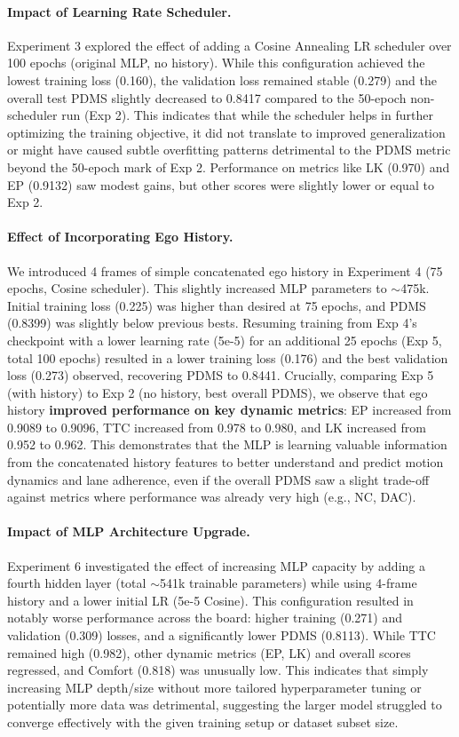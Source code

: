 \documentclass{article}
\begin{document}
\paragraph{Impact of Learning Rate Scheduler.}
Experiment 3 explored the effect of adding a Cosine Annealing LR scheduler over 100 epochs (original MLP, no history). While this configuration achieved the lowest training loss (0.160), the validation loss remained stable (0.279) and the overall test PDMS slightly decreased to 0.8417 compared to the 50-epoch non-scheduler run (Exp 2). This indicates that while the scheduler helps in further optimizing the training objective, it did not translate to improved generalization or might have caused subtle overfitting patterns detrimental to the PDMS metric beyond the 50-epoch mark of Exp 2. Performance on metrics like LK (0.970) and EP (0.9132) saw modest gains, but other scores were slightly lower or equal to Exp 2.

\paragraph{Effect of Incorporating Ego History.}
We introduced 4 frames of simple concatenated ego history in Experiment 4 (75 epochs, Cosine scheduler). This slightly increased MLP parameters to $\sim$475k. Initial training loss (0.225) was higher than desired at 75 epochs, and PDMS (0.8399) was slightly below previous bests. Resuming training from Exp 4's checkpoint with a lower learning rate (5e-5) for an additional 25 epochs (Exp 5, total 100 epochs) resulted in a lower training loss (0.176) and the best validation loss (0.273) observed, recovering PDMS to 0.8441. Crucially, comparing Exp 5 (with history) to Exp 2 (no history, best overall PDMS), we observe that ego history \textbf{improved performance on key dynamic metrics}: EP increased from 0.9089 to 0.9096, TTC increased from 0.978 to 0.980, and LK increased from 0.952 to 0.962. This demonstrates that the MLP is learning valuable information from the concatenated history features to better understand and predict motion dynamics and lane adherence, even if the overall PDMS saw a slight trade-off against metrics where performance was already very high (e.g., NC, DAC).

\paragraph{Impact of MLP Architecture Upgrade.}
Experiment 6 investigated the effect of increasing MLP capacity by adding a fourth hidden layer (total $\sim$541k trainable parameters) while using 4-frame history and a lower initial LR (5e-5 Cosine). This configuration resulted in notably worse performance across the board: higher training (0.271) and validation (0.309) losses, and a significantly lower PDMS (0.8113). While TTC remained high (0.982), other dynamic metrics (EP, LK) and overall scores regressed, and Comfort (0.818) was unusually low. This indicates that simply increasing MLP depth/size without more tailored hyperparameter tuning or potentially more data was detrimental, suggesting the larger model struggled to converge effectively with the given training setup or dataset subset size.
\end{document}

